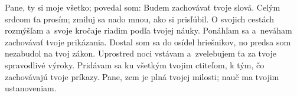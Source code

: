 Pane, ty si moje všetko;
povedal som: Budem zachovávať tvoje slová.
\versseparator
Celým srdcom ťa prosím;
zmiluj sa nado mnou, ako si prisľúbil.
\versseparator
O svojich cestách rozmýšľam
a~svoje kročaje riadim podľa tvojej náuky.
\versseparator
Ponáhľam sa a~neváham
zachovávať tvoje prikázania.
\versseparator
Dostal som sa do osídel hriešnikov,
no predsa som nezabudol na tvoj zákon.
\versseparator
Uprostred noci vstávam a~zvelebujem ťa
za tvoje spravodlivé výroky.
\versseparator
Pridávam sa ku všetkým tvojim ctiteľom,
k tým, čo zachovávajú tvoje príkazy.
\versseparator
Pane, zem je plná tvojej milosti;
nauč ma tvojim ustanoveniam.